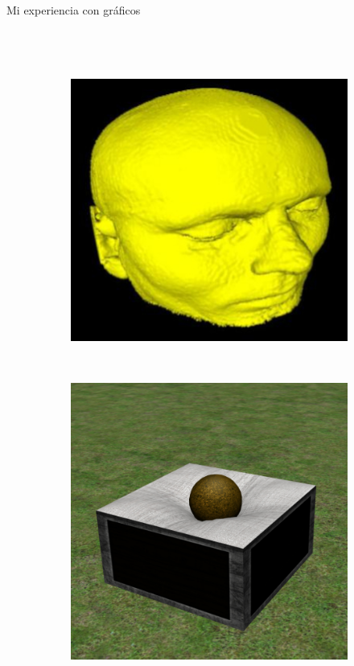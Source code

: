 \begin{frame}{Mi experiencia con gráficos}
\begin{columns}
\begin{figure}[htp]
\begin{subfigure}[b]{0.4\textwidth}
 \end{subfigure}
\\
 \begin{subfigure}[b]{0.4\textwidth}
   \includegraphics[width=\textwidth]{img/master}
 \end{subfigure}
~
\begin{subfigure}[b]{0.4\textwidth}
   \includegraphics[width=\textwidth]{img/bachelor_thesis}
 \end{subfigure}
 
\end{figure}
\end{columns}
\end{frame}
